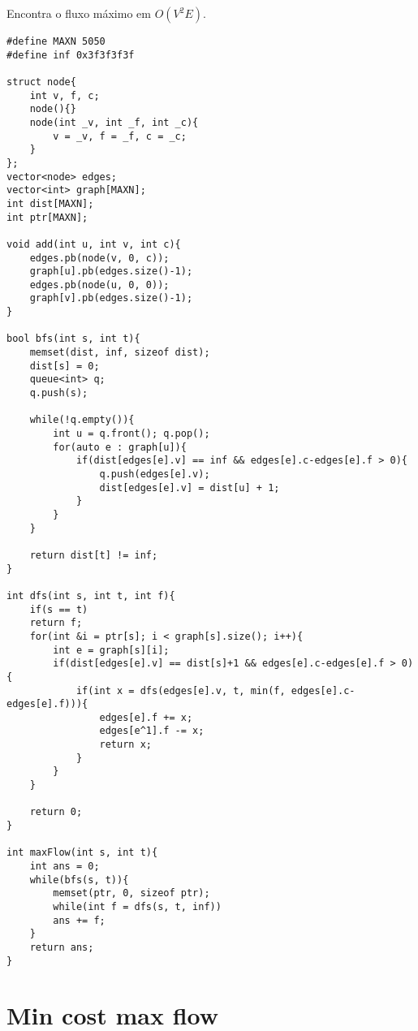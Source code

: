 Encontra o fluxo máximo em $O(V^2E)$.
\begin{multicols}{2}
	\begin{lstlisting}
#define MAXN 5050
#define inf 0x3f3f3f3f

struct node{
	int v, f, c;
	node(){}
	node(int _v, int _f, int _c){
		v = _v, f = _f, c = _c;
	}
};
vector<node> edges;
vector<int> graph[MAXN];
int dist[MAXN];
int ptr[MAXN];

void add(int u, int v, int c){
	edges.pb(node(v, 0, c));
	graph[u].pb(edges.size()-1);
	edges.pb(node(u, 0, 0));
	graph[v].pb(edges.size()-1);
}

bool bfs(int s, int t){
	memset(dist, inf, sizeof dist);
	dist[s] = 0;
	queue<int> q;
	q.push(s);
	
	while(!q.empty()){
		int u = q.front(); q.pop();
		for(auto e : graph[u]){
			if(dist[edges[e].v] == inf && edges[e].c-edges[e].f > 0){
				q.push(edges[e].v);
				dist[edges[e].v] = dist[u] + 1;
			}
		}
	}
	
	return dist[t] != inf;
}

int dfs(int s, int t, int f){
	if(s == t)
	return f;
	for(int &i = ptr[s]; i < graph[s].size(); i++){
		int e = graph[s][i];
		if(dist[edges[e].v] == dist[s]+1 && edges[e].c-edges[e].f > 0){
			if(int x = dfs(edges[e].v, t, min(f, edges[e].c-edges[e].f))){
				edges[e].f += x;
				edges[e^1].f -= x;
				return x;
			}
		}
	}
	
	return 0;
}

int maxFlow(int s, int t){
	int ans = 0;
	while(bfs(s, t)){
		memset(ptr, 0, sizeof ptr);
		while(int f = dfs(s, t, inf))
		ans += f;
	}
	return ans;
}
\end{lstlisting}
\end{multicols}

\section{Min cost max flow}

